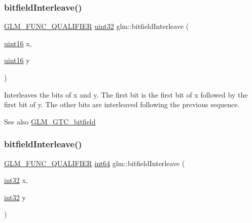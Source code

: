 \subsubsection{\texorpdfstring{bitfield\+Interleave()}{bitfieldInterleave()}\hspace{0.1cm}{\footnotesize\ttfamily [4/16]}}
{\footnotesize\ttfamily \hyperlink{setup_8hpp_a33fdea6f91c5f834105f7415e2a64407}{G\+L\+M\+\_\+\+F\+U\+N\+C\+\_\+\+Q\+U\+A\+L\+I\+F\+I\+ER} \hyperlink{group__gtc__type__precision_ga202b6a53c105fcb7e531f9b443518451}{uint32} glm\+::bitfield\+Interleave (\begin{DoxyParamCaption}\item[{\hyperlink{group__gtc__type__precision_gad8c2939e1fdd8e5828b31d95c52255d5}{uint16}}]{x,  }\item[{\hyperlink{group__gtc__type__precision_gad8c2939e1fdd8e5828b31d95c52255d5}{uint16}}]{y }\end{DoxyParamCaption})}

Interleaves the bits of x and y. The first bit is the first bit of x followed by the first bit of y. The other bits are interleaved following the previous sequence.

\begin{DoxySeeAlso}{See also}
\hyperlink{group__gtc__bitfield}{G\+L\+M\+\_\+\+G\+T\+C\+\_\+bitfield} 
\end{DoxySeeAlso}
\mbox{\label{group__gtc__bitfield_ga0de51d5985e6a703f305a5a61479babd}} 
\subsubsection{\texorpdfstring{bitfield\+Interleave()}{bitfieldInterleave()}\hspace{0.1cm}{\footnotesize\ttfamily [5/16]}}
{\footnotesize\ttfamily \hyperlink{setup_8hpp_a33fdea6f91c5f834105f7415e2a64407}{G\+L\+M\+\_\+\+F\+U\+N\+C\+\_\+\+Q\+U\+A\+L\+I\+F\+I\+ER} \hyperlink{group__gtc__type__precision_ga435d75819cce297cc5fa21bd84ef89a5}{int64} glm\+::bitfield\+Interleave (\begin{DoxyParamCaption}\item[{\hyperlink{group__gtc__type__precision_ga632d8b25f6b61659f39ea4321fab92a4}{int32}}]{x,  }\item[{\hyperlink{group__gtc__type__precision_ga632d8b25f6b61659f39ea4321fab92a4}{int32}}]{y }\end{DoxyParamCaption})}

